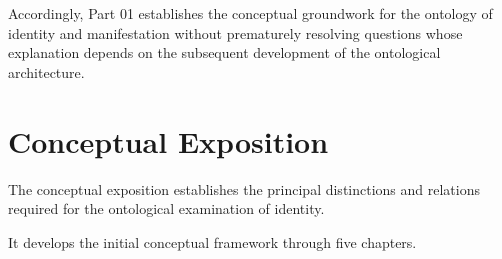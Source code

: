 Accordingly, Part 01 establishes the conceptual
groundwork for the ontology of identity and
manifestation without prematurely resolving
questions whose explanation depends on the
subsequent development of the ontological
architecture.



\section*{Conceptual Exposition}

The conceptual exposition establishes the principal
distinctions and relations required for the
ontological examination of identity.

It develops the initial conceptual framework
through five chapters.



















